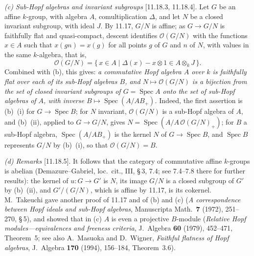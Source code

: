\par\smallskip\noindent\textit{(c) Sub-Hopf algebras and invariant subgroups} [11.18.3,
11.18.4]. Let \(G\) be an affine \(k\)-group, with algebra \(A\), comultiplication
\(\Delta\), and let \(N\) be a closed invariant subgroup, with ideal \(J\). By 11.17, \(G/N\)
is affine; as \(G\to G/N\) is faithfully flat and quasi-compact, descent identifies
\(\mathcal O(G/N)\) with the functions \(x\in A\) such that \(x(gn)=x(g)\) for all points
\(g\) of \(G\) and \(n\) of \(N\), with values in the same \(k\)-algebra, that is,
\[
  \mathcal O(G/N)=\{\,x\in A\mid\Delta(x)-x\otimes1\in A\otimes_kJ\,\}.
\]
Combined with (b), this gives: \emph{a commutative Hopf algebra \(A\) over \(k\) is
faithfully flat over each of its sub-Hopf algebras \(B\), and
\(N\mapsto\mathcal O(G/N)\) is a bijection from the set of closed invariant subgroups of
\(G=\operatorname{Spec}A\) onto the set of sub-Hopf algebras of \(A\), with inverse
\(B\mapsto\operatorname{Spec}(A/AB_+)\).} Indeed, the first assertion is (b)~(i) for
\(G\to\operatorname{Spec}B\); for \(N\) invariant, \(\mathcal O(G/N)\) is a sub-Hopf algebra
of \(A\), and (b)~(ii), applied to \(G\to G/N\), gives
\(N=\operatorname{Spec}(A/A\,\mathcal O(G/N)_+)\); for \(B\) a sub-Hopf algebra,
\(\operatorname{Spec}(A/AB_+)\) is the kernel \(N\) of \(G\to\operatorname{Spec}B\), and
\(\operatorname{Spec}B\) represents \(G/N\) by (b)~(i), so that \(\mathcal O(G/N)=B\).

\par\smallskip\noindent\textit{(d) Remarks} [11.18.5]. It follows that the category of
commutative affine \(k\)-groups is abelian (Demazure--Gabriel, loc.\ cit., III, \S\,3,
7.4; see 7.4--7.8 there for further results): the kernel of \(u:G\to G'\) is \(N\), its
image \(G/N\) is a closed subgroup of \(G'\) by (b)~(ii), and \(G'/(G/N)\), which is affine
by 11.17, is its cokernel. M.~Takeuchi gave another proof of 11.17 and of (b) and (c)
(\emph{A correspondence between Hopf ideals and sub-Hopf algebras}, Manuscripta Math.\
\textbf{7} (1972), 251--270, \S\,5), and showed that in (c) \(A\) is even a projective
\(B\)-module (\emph{Relative Hopf modules---equivalences and freeness criteria}, J.\
Algebra \textbf{60} (1979), 452--471, Theorem~5; see also A.~Masuoka and D.~Wigner,
\emph{Faithful flatness of Hopf algebras}, J.\ Algebra \textbf{170} (1994), 156--184,
Theorem~3.6).
